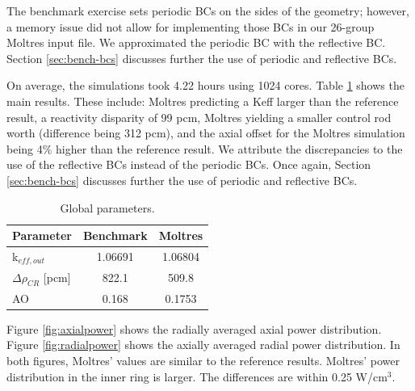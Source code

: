 The benchmark exercise sets periodic \glspl{BC} on the sides of the geometry; however, a memory issue did not allow for implementing those BCs in our 26-group Moltres input file.
We approximated the periodic BC with the reflective BC.
Section \ref{sec:bench-bcs} discusses further the use of periodic and reflective BCs.

On average, the simulations took 4.22 hours using 1024 cores.
Table \ref{tab:globalparam} shows the main results.
These include: Moltres predicting a \gls{Keff} larger than the reference result, a reactivity disparity of 99 pcm, Moltres yielding a smaller control rod worth (difference being 312 pcm), and the axial offset for the Moltres simulation being 4$\%$ higher than the reference result.
We attribute the discrepancies to the use of the reflective BCs instead of the periodic BCs.
Once again, Section \ref{sec:bench-bcs} discusses further the use of periodic and reflective BCs.

\begin{table}[htbp!]
  \centering
  \caption{Global parameters.}
  \begin{tabular}{lcc}
  \toprule
  Parameter 	&  Benchmark  &  Moltres    \\
  \midrule
  k$_{eff, out}$ 	&  1.06691    &  1.06804    \\
  $\Delta \rho_{CR}$ [pcm]  & 822.1 	& 509.8 \\
  AO        	&  0.168      &  0.1753     \\
  \bottomrule
  \end{tabular}
  \label{tab:globalparam}
\end{table}

Figure \ref{fig:axialpower} shows the radially averaged axial power distribution.
Figure \ref{fig:radialpower} shows the axially averaged radial power distribution.
In both figures, Moltres' values are similar to the reference results.
Moltres' power distribution in the inner ring is larger.
The differences are within 0.25 W/cm$^3$.


